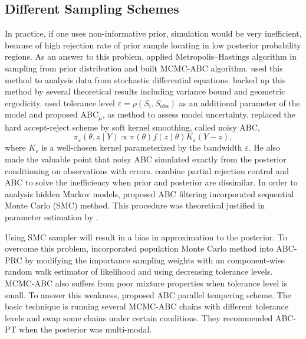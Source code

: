 \subsection{Different Sampling Schemes}

In practice, if one uses non-informative prior, simulation would be
very inefficient, because of high rejection rate of prior sample locating
in low posterior probability regions. As an answer to this problem,
\citet{marjoram2003markov} applied Metropolis--Hastings algorithm
in sampling from prior distribution and built MCMC-ABC algorithm.
\citet{picchini2014inference} used this method to analysis data from
stochastic differential equations. \citet{lee2014variance} backed
up this method by several theoretical results including variance bound
and geometric ergodicity. \citet{ratmann2009model} used tolerance
level $\varepsilon=\rho\left(S_{i},S_{\mathrm{obs}}\right)$ as an
additional parameter of the model and proposed ABC$_{\mu}$, as method
to assess model uncertainty. \citet{wilkinson2013approximate} replaced
the hard accept-reject scheme by soft kernel smoothing, called noisy
ABC, 
\[
\pi_{\varepsilon}\left(\theta,z\mid Y\right)\propto\pi\left(\theta\right)f\left(z\mid\theta\right)K_{\varepsilon}\left(Y-z\right),
\]
where $K_{\varepsilon}$ is a well-chosen kernel parameterized by
the bandwidth $\varepsilon$. He also made the valuable point that
noisy ABC simulated exactly from the posterior conditioning on observations
with errors. \citet{sisson2007sequential} combine partial rejection
control and ABC to solve the inefficiency when prior and posterior
are dissimilar. In order to analysis hidden Markov models, \citet{jasra2012filtering}
proposed ABC filtering incorporated sequential Monte Carlo (SMC) method.
This procedure was theoretical justified in parameter estimation by
\citet{dean2014parameter}. %
\begin{comment}
detail of justification
\end{comment}
Using SMC sampler will result in a bias in approximation to the posterior.
To overcome this problem, \citet{beaumont2009adaptive} incorporated
population Monte Carlo method into ABC-PRC by modifying the importance
sampling weights with an component-wise random walk estimator of likelihood
and using decreasing tolerance levels. MCMC-ABC also suffers from
poor mixture properties when tolerance level is small. To answer this
weakness, \citet{baragatti2013likelihood} proposed ABC parallel tempering
scheme. The basic technique is running several MCMC-ABC chains with
different tolerance levels and swap some chains under certain conditions.
They recommended ABC-PT when the posterior was multi-modal. 


